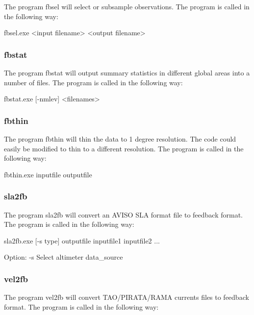 \documentclass[../main/NEMO_manual]{subfiles}
\begin{document}
The program fbsel will select or subsample observations.
The program is called in the following way:

\footnotesize
\begin{cmds}
fbsel.exe <input filename> <output filename>
\end{cmds}

\subsubsection{fbstat}

The program fbstat will output summary statistics in different global areas into a number of files.
The program is called in the following way:

\footnotesize
\begin{cmds}
fbstat.exe [-nmlev] <filenames>
\end{cmds}

\subsubsection{fbthin}

The program fbthin will thin the data to 1 degree resolution.
The code could easily be modified to thin to a different resolution.
The program is called in the following way:

\footnotesize
\begin{cmds}
fbthin.exe inputfile outputfile
\end{cmds}

\subsubsection{sla2fb}

The program sla2fb will convert an AVISO SLA format file to feedback format.
The program is called in the following way:

\footnotesize
\begin{cmds}
sla2fb.exe [-s type] outputfile inputfile1 inputfile2 ...

Option:
     -s            Select altimeter data_source
\end{cmds}

\subsubsection{vel2fb}

The program vel2fb will convert TAO/PIRATA/RAMA currents files to feedback format.
The program is called in the following way:
\end{document}
